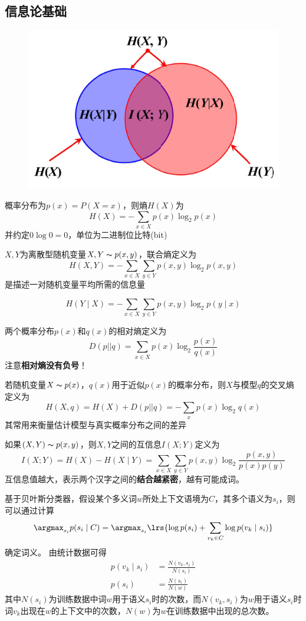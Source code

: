 \subsection{信息论基础}
\begin{figure}[H]
\centering
\includegraphics[width=0.4\linewidth]{fig/entropy.png}
\end{figure}
\begin{definition}[熵/自信息]
概率分布为$p(x)=P(X=x)$，则熵$H(X)$为
\[H(X)=-\sum_{x\in X}p(x)\log_2p(x)\]
并约定$0\log 0=0$，单位为二进制位比特(bit)
\end{definition}
\begin{definition}[联合熵]
$X,Y$为离散型随机变量$X,Y\thicksim p(x,y)$，联合熵定义为
\[H(X,Y)=-\sum_{x\in X}\sum_{y\in Y}p(x,y)\log_2 p(x,y)\]
是描述一对随机变量平均所需的信息量
\end{definition}
\begin{definition}[条件熵]
\[H(Y\mid X)=-\sum_{x\in X}\sum_{y\in Y}p(x,y)\log_2 p(y\mid x)\]
\end{definition}
\begin{definition}
两个概率分布$p(x)$和$q(x)$的相对熵定义为
\[D(p||q)=\sum_{x\in X}p(x)\log_2\frac{p(x)}{q(x)}\]
注意\textbf{相对熵没有负号}！
\end{definition}
\begin{definition}[交叉熵]
若随机变量$X\thicksim p(x)$，$q(x)$用于近似$p(x)$的概率分布，则$X$与模型$q$的交叉熵定义为
\[H(X,q)=H(X)+D(p||q)=-\sum_x p(x)\log_2 q(x)\]
其常用来衡量估计模型与真实概率分布之间的差异
\end{definition}
\begin{definition}[互信息]
如果$(X,Y)\thicksim p(x,y)$，则$X,Y$之间的互信息$I(X;Y)$定义为
\[I(X;Y)=H(X)-H(X\mid Y)=\sum_{x\in X}\sum_{y\in Y}p(x,y)\log_2\frac{p(x,y)}{p(x)p(y)}\]
互信息值越大，表示两个汉字之间的\textbf{结合越紧密}，越有可能成词。
\end{definition}

\begin{example}[基于上下文分类的消歧方法]
基于贝叶斯分类器，假设某个多义词$w$所处上下文语境为$C$，其多个语义为$s_i$，则可以通过计算
\[\argmax_{s_i} p(s_i\mid C)=\argmax_{s_i}\lrs{\log p(s_i)+\sum_{v_k\in C}\log p(v_k\mid s_i)}\]
确定词义。
由统计数据可得
\[\begin{aligned}
p(v_k\mid s_i)&=\frac{N(v_k,s_i)}{N(s_i)}\\
p(s_i)&=\frac{N(s_i)}{N(w)}
\end{aligned}\]
其中$N(s_i)$为训练数据中词$w$用于语义$s_i$时的次数，而$N(v_k,s_i)$为$w$用于语义$s_i$时词$v_k$出现在$w$的上下文中的次数，$N(w)$为$w$在训练数据中出现的总次数。
\end{example}

